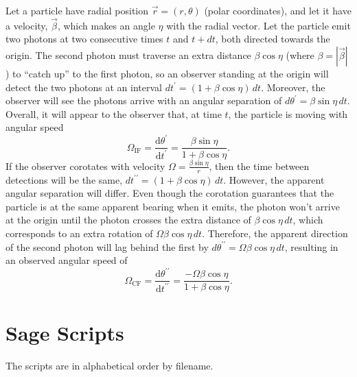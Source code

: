 \documentclass{book}
\newcommand{\deriv}[2]{\frac{\text{d}{#1}}{\text{d}{#2}}}
\begin{document}
Let a particle have radial position $\vec{r} = (r,\theta)$ (polar coordinates), and let it have a velocity, $\vec{\beta}$, which makes an angle $\eta$ with the radial vector.
Let the particle emit two photons at two consecutive times $t$ and $t+dt$, both directed towards the origin.
The second photon must traverse an extra distance $\beta\cos\eta$ (where $\beta = |\vec{\beta}|$) to ``catch up'' to the first photon, so an observer standing at the origin will detect the two photons at an interval $dt^\prime = (1+\beta\cos\eta)\,dt$.
Moreover, the observer will see the photons arrive with an angular separation of $d\theta^\prime = \beta\sin\eta\,dt$.
Overall, it will appear to the observer that, at time $t$, the particle is moving with angular speed
\begin{equation}
    \Omega_\text{IF}
        = \deriv{\theta^\prime}{t^\prime}
        = \frac{\beta\sin\eta}{1 + \beta\cos\eta}.
\end{equation}
If the observer corotates with velocity $\Omega = \frac{\beta\sin\eta}{r}$, then the time between detections will be the same, $dt^{\prime\prime} = (1+\beta\cos\eta)\,dt$.
However, the apparent angular separation will differ.
Even though the corotation guarantees that the particle is at the same apparent bearing when it emits, the photon won't arrive at the origin until the photon crosses the extra distance of $\beta\cos\eta\,dt$, which corresponds to an extra rotation of $\Omega\beta\cos\eta\,dt$.
Therefore, the apparent direction of the second photon will lag behind the first by $d\theta^{\prime\prime} = \Omega\beta\cos\eta\,dt$, resulting in an observed angular speed of
\begin{equation}
    \Omega_\text{CF}
        = \deriv{\theta^{\prime\prime}}{t^{\prime\prime}}
        = \frac{-\Omega\beta\cos\eta}{1+\beta\cos\eta}.
\end{equation}

\newpage
\chapter{Sage Scripts}

\newcommand{\lstsage}[2]{\subsection*{#1}\label{sage:#2}}

The scripts are in alphabetical order by filename.
\end{document}
